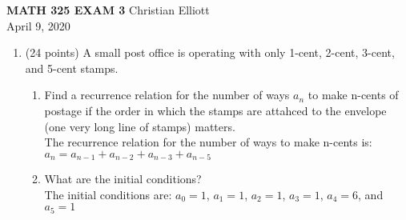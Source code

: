 \documentclass[12pt, letterpaper]{article}
\author{Christian Elliott}
\date{April 8, 2020}
\begin{document}
\begin{flushleft}
  \textbf{MATH 325 EXAM 3} \hfill Christian Elliott \\
  \hfill April 9, 2020 \\
  
  \begin{enumerate}
  \item (24 points) A small post office is operating with only 1-cent, 2-cent, 3-cent, and 5-cent stamps. \\
    \begin{enumerate}
    \item Find a recurrence relation for the number of ways $a_n$ to make n-cents of postage if the order in which the stamps are attahced to the envelope (one very long line of stamps) matters. \\
      \smallskip
      The recurrence relation for the number of ways to make n-cents is: $a_n = a_{n-1} + a_{n-2} + a_{n-3} + a_{n-5}$ \\

    \item What are the initial conditions? \\
      \smallskip
      The initial conditions are:
      $a_0 = 1$, $a_1 = 1$, $a_2 = 1$, $a_3 = 1$, $a_4 = 6$, and $a_5 = 1$ \\
      

\end{enumerate}
\end{enumerate}
\end{flushleft}
\end{document}
